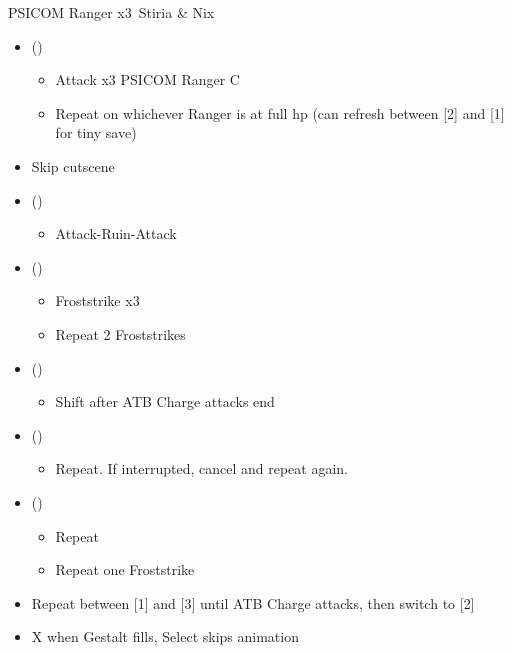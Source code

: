 
\renewcommand{\first}{[1] \com (\com)}
\renewcommand{\second}{[2] \sen (\sen)}
\renewcommand{\third}{[3] \rav (\rav)}

\begin{battle}[0:55]{PSICOM Ranger x3\, Stiria \& Nix}
	\begin{itemize}
		\item \first
		      \begin{itemize}
			      \item Attack x3 PSICOM Ranger C
			      \item Repeat on whichever Ranger is at full hp (can refresh between [2] and [1] for tiny save)
		      \end{itemize}
		\item Skip cutscene
		\item \first
		      \begin{itemize}
			      \item Attack-Ruin-Attack
		      \end{itemize}
		\item \third
		      \begin{itemize}
			      \item Froststrike x3
			      \item Repeat 2 Froststrikes
		      \end{itemize}
		\item \second
		      \begin{itemize}
			      \item Shift after ATB Charge attacks end
		      \end{itemize}
		\item \first
		      \begin{itemize}
			      \item Repeat. If interrupted, cancel and repeat again.
		      \end{itemize}
		\item \third
		      \begin{itemize}
			      \item Repeat
			      \item Repeat one Froststrike
		      \end{itemize}
		\item Repeat between [1] and [3] until ATB Charge attacks, then switch to [2]
		\item X when Gestalt fills, Select skips animation
	\end{itemize}
	 
\end{battle}
\vfill
\ 
\columnbreak